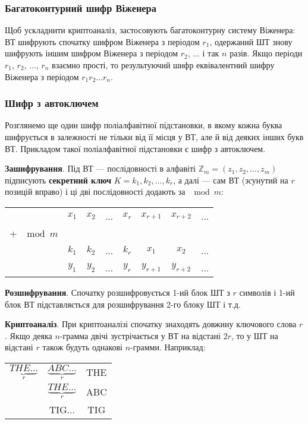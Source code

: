 \subsubsection{Багатоконтурний шифр Віженера}

Щоб ускладнити криптоаналіз, застосовують багатоконтурну систему
Віженера: ВТ шифрують спочатку шифром Віженера з періодом $r_1$,
одержаний ШТ знову шифрують іншим шифром Віженера з періодом $r_2$, ... і
так $n$ разів. Якщо періоди $r_1$, $r_2$, ..., $r_n$ взаємно прості, то результуючий шифр
еквівалентний шифру Віженера з періодом $r_1r_2...r_n$.

\subsubsection{Шифр з автоключем}

Розглянемо ще один шифр поліалфавітної підстановки, в якому кожна
буква шифрується в залежності не тільки від її місця у ВТ, але й від деяких
інших букв ВТ. Прикладом такої поліалфавітної підстановки є шифр з
автоключем.

\textbf{Зашифрування}. Під ВТ --- послідовності в алфавіті $\mathbb{Z}_m = (z_1, z_2, ..., z_m)$
підписують \textbf{секретний ключ} $K = k_1, k_2, ..., k_r$, а далі --- сам ВТ (зсунутий на $r$
позицій вправо) і ці дві послідовності додають за $\mod m$:

\begin{table}
    \centering
    \begin{tabular}{cccccccc}
        & $x_1$ & $x_2$ & ...  & $x_r$ & $x_{r+1}$ & $x_{r+2}$ & ... \\
        + $\mod m$ &&&&&&& \\
        & $k_1$ & $k_2$ & ...  & $k_r$ & $x_{1}$ & $x_{2}$ & ... \\
        \cline{2-8}
        & $y_1$ & $y_2$ & ...  & $y_r$ & $y_{r+1}$ & $y_{r+2}$ & ... \\
    \end{tabular}
\end{table}

\textbf{Розшифрування}. Спочатку розшифровується 1-ий блок ШТ з $r$
символів і 1-ий блок ВТ підставляється для розшифрування 2-го блоку ШТ і
т.д.

\textbf{Криптоаналіз}. При криптоаналізі спочатку знаходять довжину
ключового слова $r$. Якщо деяка $n$-грамма двічі зустрічається у ВТ на
відстані $2r$, то у ШТ на відстані $r$ також будуть однакові $n$-грамми.
Наприклад:

\begin{table}
    \centering
    \begin{tabular}{ccc}
        $\underbrace{THE...}_r$ & $\underbrace{ABC...}_r$ & THE  \\
                                & $\underbrace{THE...}_r$ & ABC  \\
        \hline                  & TIG...                  & TIG  \\
    \end{tabular}
\end{table}

